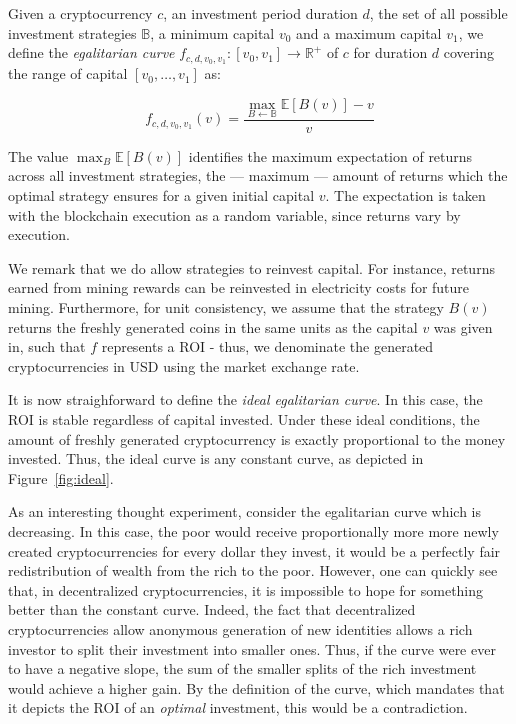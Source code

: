 \begin{definition}
    Given a cryptocurrency $c$, an investment period duration $d$, the set of
    all possible investment strategies $\mathbb{B}$, a minimum capital $v_0$
    and a maximum capital $v_1$, we define the \emph{egalitarian curve}
    $f_{c,d,v_0,v_1}: [v_0, v_1] \longrightarrow \mathbb{R}^+$ of $c$ for
    duration $d$ covering the range of capital $[v_0, \dots, v_1]$ as:

    \[
        f_{c,d,v_0,v_1}(v) = \frac{\underset{B \leftarrow \mathbb{B}}{\max}{\mathbb{E}[B(v)]} - v}{v}
    \]
\end{definition}

The value $\max_B{\mathbb{E}[B(v)]}$ identifies the maximum expectation of
returns across all investment strategies, \ie the --- maximum --- amount of
returns which the optimal strategy ensures for a given initial capital $v$.
The expectation is taken with the blockchain execution as a random variable,
since returns vary by execution.

We remark that we do allow strategies to reinvest capital. For instance,
returns earned from mining rewards can be reinvested in electricity costs for
future mining. Furthermore, for unit consistency, we assume that the strategy
$B(v)$ returns the freshly generated coins in the same units as the capital $v$
was given in, such that $f$ represents a ROI - thus, we denominate the
generated cryptocurrencies in USD using the market exchange rate.

It is now straighforward to define the \emph{ideal egalitarian curve}. In this
case, the ROI is stable regardless of capital invested. Under these ideal
conditions, the amount of freshly generated cryptocurrency is exactly
proportional to the money invested. Thus, the ideal curve is any constant
curve, as depicted in Figure~\ref{fig:ideal}.

As an interesting thought experiment, consider the egalitarian curve which is
decreasing. In this case, the poor would receive proportionally more more newly
created cryptocurrencies for every dollar they invest, \ie it would be a
perfectly fair redistribution of wealth from the rich to the poor. However, one
can quickly see that, in decentralized cryptocurrencies, it is impossible to
hope for something better than the constant curve. Indeed, the fact that
decentralized cryptocurrencies allow anonymous generation of new identities
allows a rich investor to split their investment into smaller ones.  Thus, if
the curve were ever to have a negative slope, the sum of the smaller splits of
the rich investment would achieve a higher gain. By the definition of the
curve, which mandates that it depicts the ROI of an \emph{optimal} investment,
this would be a contradiction.


